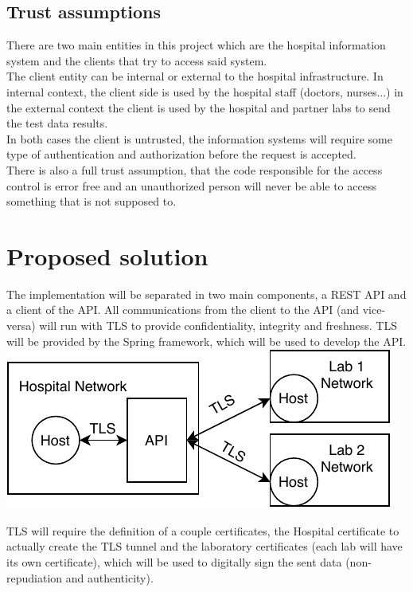 \subsection{Trust assumptions}


There are two main entities in this project which are the hospital information system and the clients that try to access said system. \\


The client entity can be internal or external to the hospital infrastructure. In internal context, the client side is used by the hospital staff (doctors, nurses...) in the external context the client is used by the hospital and partner labs to send the test data results. \\

In both cases the client is untrusted, the information systems will require some type of authentication and authorization before the request is accepted. \\ 

There is also a full trust assumption, that the code responsible for the access control is error free and an unauthorized person will never be able to access something that is not supposed to. \\

\section{Proposed solution}

The implementation will be separated in two main components, a REST API and a client of the API.
All communications from the client to the API (and vice-versa) will run with TLS to provide confidentiality, integrity and freshness. TLS will be provided by the Spring framework, which will be used to develop the API. \\

	\includegraphics[width=.4\textwidth]{figs/network_layout.pdf}
	
TLS will require the definition of a couple certificates, the Hospital certificate to actually create the TLS tunnel and the laboratory certificates (each lab will have its own certificate), which will be used to digitally sign the sent data (non-repudiation and authenticity). \\ 

